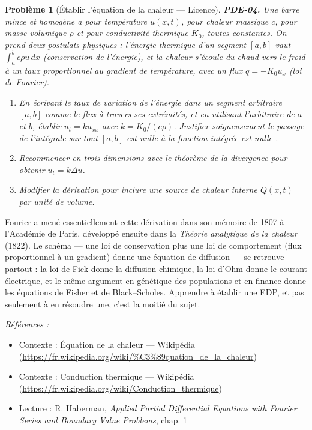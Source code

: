 \documentclass[11pt]{article}
\newtheorem{problem}{Problème}
\newenvironment{refs}{\par\small\noindent\emph{Références :}\begin{itemize}\setlength\itemsep{0pt}}{\end{itemize}\normalsize}
\begin{document}
\begin{problem}[{Établir l'équation de la chaleur --- Licence}]
\textbf{PDE-04.} Une barre mince et homogène a pour température $u(x,t)$,
pour chaleur massique $c$, pour masse volumique $\rho$ et pour conductivité thermique
$K_0$, toutes constantes. On prend deux postulats physiques : l'énergie thermique d'un segment
$[a,b]$ vaut $\int_a^b c\rho u\,dx$ (conservation de l'énergie), et la chaleur s'écoule du
chaud vers le froid à un taux proportionnel au gradient de température, avec un flux
$q = -K_0 u_x$ (loi de Fourier).
\begin{enumerate}
\item[(a)] En écrivant le taux de variation de l'énergie dans un segment \textit{arbitraire}
$[a,b]$ comme le flux à travers ses extrémités, et en utilisant l'arbitraire de $a$
et $b$, établir $u_t = k u_{xx}$ avec $k = K_0/(c\rho)$. Justifier soigneusement le
passage de \og{} l'intégrale sur tout $[a,b]$ est nulle \fg{} à \og{} la fonction intégrée est
nulle \fg{}.
\item[(b)] Recommencer en trois dimensions avec le théorème de la divergence pour obtenir
$u_t = k\Delta u$.
\item[(c)] Modifier la dérivation pour inclure une source de chaleur interne
$Q(x,t)$ par unité de volume.
\end{enumerate}

\end{problem}

\noindent Fourier a mené essentiellement cette dérivation dans son mémoire de 1807 à
l'Académie de Paris, développé ensuite dans la \textit{Théorie analytique de la chaleur}
(1822). Le schéma --- une loi de conservation plus une loi de comportement (flux proportionnel
à un gradient) donne une équation de diffusion --- se retrouve partout : la loi de Fick donne la
diffusion chimique, la loi d'Ohm donne le courant électrique, et le même argument en génétique des
populations et en finance donne les équations de Fisher et de Black--Scholes.
Apprendre à établir une EDP, et pas seulement à en résoudre une, c'est la moitié du sujet.

\begin{refs}
\item Contexte : Équation de la chaleur --- Wikipédia (\url{https://fr.wikipedia.org/wiki/%C3%89quation_de_la_chaleur})
\item Contexte : Conduction thermique --- Wikipédia (\url{https://fr.wikipedia.org/wiki/Conduction_thermique})
\item Lecture : R. Haberman, \textit{Applied Partial Differential Equations with Fourier Series and Boundary Value Problems}, chap. 1
\end{refs}
\end{document}
